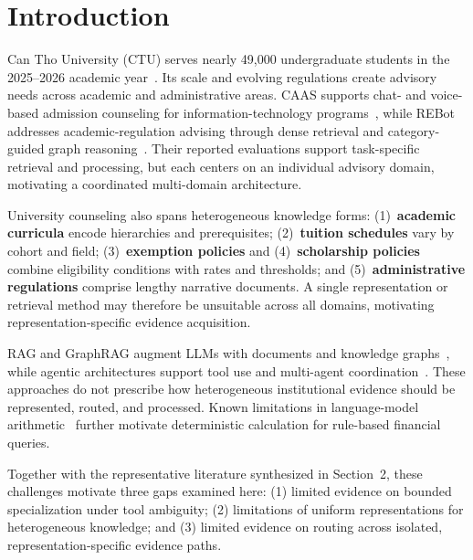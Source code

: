\section{Introduction}
\label{sec:intro}

Can Tho University (CTU) serves nearly 49,000 undergraduate students in the 2025--2026 academic year~\cite{ctu2025opening}. Its scale and evolving regulations create advisory needs across academic and administrative areas. CAAS supports chat- and voice-based admission counseling for information-technology programs~\cite{ma2023caas}, while REBot addresses academic-regulation advising through dense retrieval and category-guided graph reasoning~\cite{ma2025rebot}. Their reported evaluations support task-specific retrieval and processing, but each centers on an individual advisory domain, motivating a coordinated multi-domain architecture.

University counseling also spans heterogeneous knowledge forms: (1)~\textbf{academic curricula} encode hierarchies and prerequisites; (2)~\textbf{tuition schedules} vary by cohort and field; (3)~\textbf{exemption policies} and (4)~\textbf{scholarship policies} combine eligibility conditions with rates and thresholds; and (5)~\textbf{administrative regulations} comprise lengthy narrative documents. A single representation or retrieval method may therefore be unsuitable across all domains, motivating representation-specific evidence acquisition.

RAG and GraphRAG augment LLMs with documents and knowledge graphs~\cite{lewis2020rag,gao2023rag_survey,edge2024graphrag}, while agentic architectures support tool use and multi-agent coordination~\cite{yao2023react,wu2023autogen,schick2023toolformer}. These approaches do not prescribe how heterogeneous institutional evidence should be represented, routed, and processed. Known limitations in language-model arithmetic~\cite{qian2023limitations} further motivate deterministic calculation for rule-based financial queries.

Together with the representative literature synthesized in Section~2, these challenges motivate three gaps examined here: (1) limited evidence on bounded specialization under tool ambiguity; (2) limitations of uniform representations for heterogeneous knowledge; and (3) limited evidence on routing across isolated, representation-specific evidence paths.

